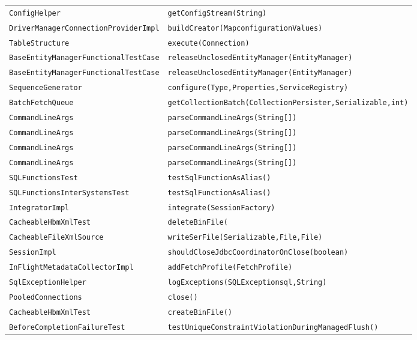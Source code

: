 \begin{center}
\begin{longtable}{ll}
\lstinline/ConfigHelper/&{\lstinline/getConfigStream(String)/}\\
\lstinline/DriverManagerConnectionProviderImpl/&{\lstinline/buildCreator(MapconfigurationValues)/}\\
\lstinline/TableStructure/&{\lstinline/execute(Connection)/}\\
\lstinline/BaseEntityManagerFunctionalTestCase/&{\lstinline/releaseUnclosedEntityManager(EntityManager)/}\\
\lstinline/BaseEntityManagerFunctionalTestCase/&{\lstinline/releaseUnclosedEntityManager(EntityManager)/}\\
\lstinline/SequenceGenerator/&{\lstinline/configure(Type,Properties,ServiceRegistry)/}\\
\lstinline/BatchFetchQueue/&{\lstinline/getCollectionBatch(CollectionPersister,Serializable,int)/}\\
\lstinline/CommandLineArgs/&{\lstinline/parseCommandLineArgs(String[])/}\\
\lstinline/CommandLineArgs/&{\lstinline/parseCommandLineArgs(String[])/}\\
\lstinline/CommandLineArgs/&{\lstinline/parseCommandLineArgs(String[])/}\\
\lstinline/CommandLineArgs/&{\lstinline/parseCommandLineArgs(String[])/}\\
\lstinline/SQLFunctionsTest/&{\lstinline/testSqlFunctionAsAlias()/}\\
\lstinline/SQLFunctionsInterSystemsTest/&{\lstinline/testSqlFunctionAsAlias()/}\\
\lstinline/IntegratorImpl/&{\lstinline/integrate(SessionFactory)/}\\
\lstinline/CacheableHbmXmlTest/&{\lstinline/deleteBinFile(/}\\
\lstinline/CacheableFileXmlSource/&{\lstinline/writeSerFile(Serializable,File,File)/}\\
\lstinline/SessionImpl/&{\lstinline/shouldCloseJdbcCoordinatorOnClose(boolean)/}\\
\lstinline/InFlightMetadataCollectorImpl/&{\lstinline/addFetchProfile(FetchProfile)/}\\
\lstinline/SqlExceptionHelper/&{\lstinline/logExceptions(SQLExceptionsql,String)/}\\
\lstinline/PooledConnections/&{\lstinline/close()/}\\
\lstinline/CacheableHbmXmlTest/&{\lstinline/createBinFile()/}\\
\lstinline/BeforeCompletionFailureTest/&{\lstinline/testUniqueConstraintViolationDuringManagedFlush()/}\\
\end{longtable}
\end{center}

